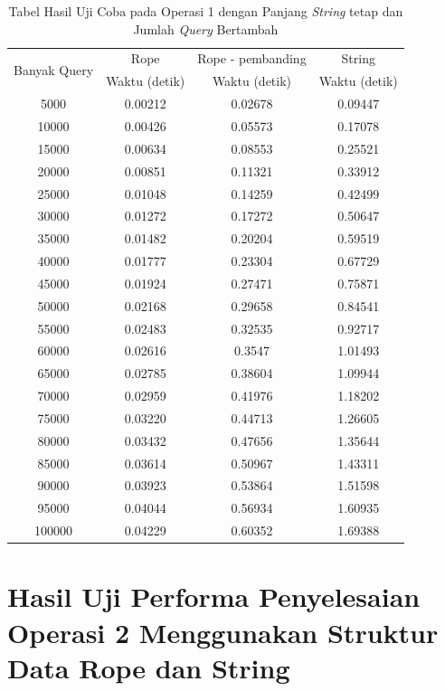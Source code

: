 \begin{appendices}
  \begin{table} [H]
    \centering
  	  \begin{tabular}{|c|c|c|c|}
  		  \hline
  		  \multirow{2}{*}{Banyak Query} & Rope & Rope - pembanding & String\\
  		    		  & Waktu (detik) & Waktu (detik) & Waktu (detik)\\ \hline
  		  5000	& 0.00212	& 0.02678	& 0.09447\\ \hline
  		  10000	& 0.00426	& 0.05573	& 0.17078\\ \hline
  		  15000	& 0.00634	& 0.08553	& 0.25521\\ \hline
  		  20000	& 0.00851	& 0.11321	& 0.33912\\ \hline
  		  25000	& 0.01048	& 0.14259	& 0.42499\\ \hline
  		  30000	& 0.01272	& 0.17272	& 0.50647\\ \hline
  		  35000	& 0.01482	& 0.20204	& 0.59519\\ \hline
  		  40000	& 0.01777	& 0.23304	& 0.67729\\ \hline
  		  45000	& 0.01924	& 0.27471	& 0.75871\\ \hline
  		  50000	& 0.02168	& 0.29658	& 0.84541\\ \hline
  		  55000	& 0.02483	& 0.32535	& 0.92717\\ \hline
  		  60000	& 0.02616	& 0.3547	& 1.01493\\ \hline
  		  65000	& 0.02785	& 0.38604	& 1.09944\\ \hline
  		  70000	& 0.02959	& 0.41976	& 1.18202\\ \hline
  		  75000	& 0.03220	& 0.44713	& 1.26605\\ \hline
  		  80000	& 0.03432	& 0.47656	& 1.35644\\ \hline
  		  85000	& 0.03614	& 0.50967	& 1.43311\\ \hline
  		  90000	& 0.03923	& 0.53864	& 1.51598\\ \hline
  		  95000	& 0.04044	& 0.56934	& 1.60935\\ \hline
  		  100000	& 0.04229	& 0.60352	& 1.69388\\ \hline
  	  \end{tabular}\caption{Tabel Hasil Uji Coba pada Operasi 1 dengan Panjang \textit{String} tetap dan Jumlah \textit{Query} Bertambah}
  	  \label{tab:operasi1query}
    \end{table}
    
  \chapter{Hasil Uji Performa Penyelesaian Operasi 2 Menggunakan Struktur Data Rope dan String}
  \setcounter{figure}{0}
  \renewcommand{\thetable}{C.\arabic{table}}
  \renewcommand{\thefigure}{C.\arabic{figure}}
  

\end{appendices}
